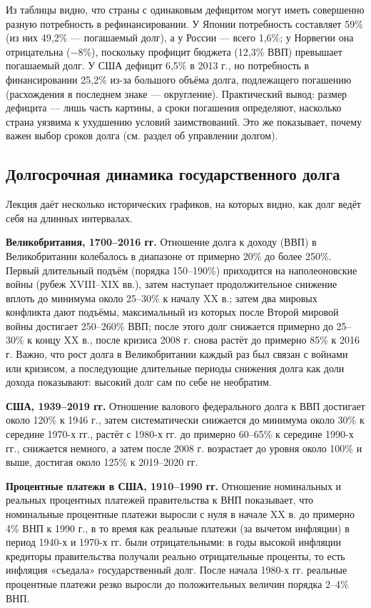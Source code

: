 \documentclass[11pt,a4paper]{article}
\begin{document}
Из таблицы видно, что страны с одинаковым дефицитом могут иметь совершенно разную потребность в рефинансировании. У Японии потребность составляет 59\% (из них 49,2\% --- погашаемый долг), а у России --- всего 1,6\%; у Норвегии она отрицательна ($-8$\%), поскольку профицит бюджета (12,3\% ВВП) превышает погашаемый долг. У США дефицит 6,5\% в 2013 г., но потребность в финансировании 25,2\% из-за большого объёма долга, подлежащего погашению (расхождения в последнем знаке --- округление). Практический вывод: размер дефицита --- лишь часть картины, а сроки погашения определяют, насколько страна уязвима к ухудшению условий заимствований. Это же показывает, почему важен выбор сроков долга (см. раздел об управлении долгом).

\subsection{Долгосрочная динамика государственного долга}

Лекция даёт несколько исторических графиков, на которых видно, как долг ведёт себя на длинных интервалах.

\textbf{Великобритания, 1700--2016 гг.} Отношение долга к доходу (ВВП) в Великобритании колебалось в диапазоне от примерно 20\% до более 250\%. Первый длительный подъём (порядка 150--190\%) приходится на наполеоновские войны (рубеж XVIII--XIX вв.), затем наступает продолжительное снижение вплоть до минимума около 25--30\% к началу XX в.; затем два мировых конфликта дают подъёмы, максимальный из которых после Второй мировой войны достигает 250--260\% ВВП; после этого долг снижается примерно до 25--30\% к концу XX в., после кризиса 2008 г. снова растёт до примерно 85\% к 2016 г. Важно, что рост долга в Великобритании каждый раз был связан с войнами или кризисом, а последующие длительные периоды снижения долга как доли дохода показывают: высокий долг сам по себе не необратим.

\textbf{США, 1939--2019 гг.} Отношение валового федерального долга к ВВП достигает около 120\% к 1946 г., затем систематически снижается до минимума около 30\% к середине 1970-х гг., растёт с 1980-х гг. до примерно 60--65\% к середине 1990-х гг., снижается немного, а затем после 2008 г. возрастает до уровня около 100\% и выше, достигая около 125\% к 2019--2020 гг.

\textbf{Процентные платежи в США, 1910--1990 гг.} Отношение номинальных и реальных процентных платежей правительства к ВНП показывает, что номинальные процентные платежи выросли с нуля в начале XX в. до примерно 4\% ВНП к 1990 г., в то время как реальные платежи (за вычетом инфляции) в период 1940-х и 1970-х гг. были отрицательными: в годы высокой инфляции кредиторы правительства получали реально отрицательные проценты, то есть инфляция «съедала» государственный долг. После начала 1980-х гг. реальные процентные платежи резко выросли до положительных величин порядка 2--4\% ВНП.
\end{document}
